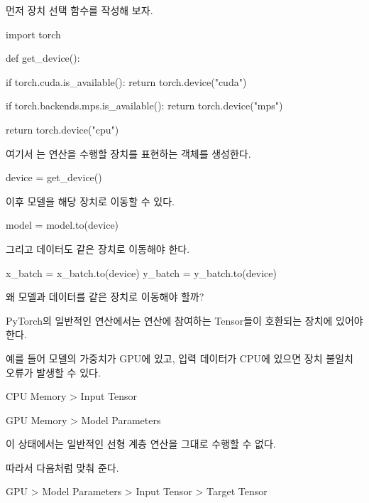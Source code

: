 먼저 장치 선택 함수를 작성해 보자.

\begin{dhkcode}
import torch


def get_device():

    if torch.cuda.is_available():
        return torch.device("cuda")

    if torch.backends.mps.is_available():
        return torch.device("mps")

    return torch.device("cpu")
\end{dhkcode}

여기서 는 연산을 수행할 장치를 표현하는 객체를 생성한다.

\begin{dhkcode}
device = get_device()
\end{dhkcode}

이후 모델을 해당 장치로 이동할 수 있다.

\begin{dhkcode}
model = model.to(device)
\end{dhkcode}

그리고 데이터도 같은 장치로 이동해야 한다.

\begin{dhkcode}
x_batch = x_batch.to(device)
y_batch = y_batch.to(device)
\end{dhkcode}

\begin{dhknote}
\begin{dhksmry}[centered]
왜 모델과 데이터를 같은 장치로 이동해야 할까?
\end{dhksmry}
\end{dhknote}

PyTorch의 일반적인 연산에서는 연산에 참여하는 Tensor들이 호환되는 장치에 있어야 한다.

예를 들어 모델의 가중치가 GPU에 있고, 입력 데이터가 CPU에 있으면 장치 불일치 오류가 발생할 수 있다.

\begin{dhkdir}[in=6]
CPU Memory
> Input Tensor
\end{dhkdir}

\begin{dhkdir}[in=6]
GPU Memory
> Model Parameters
\end{dhkdir}

이 상태에서는 일반적인 선형 계층 연산을 그대로 수행할 수 없다.

따라서 다음처럼 맞춰 준다.

\begin{dhkdir}[in=6]
GPU
> Model Parameters
> Input Tensor
> Target Tensor
\end{dhkdir}

